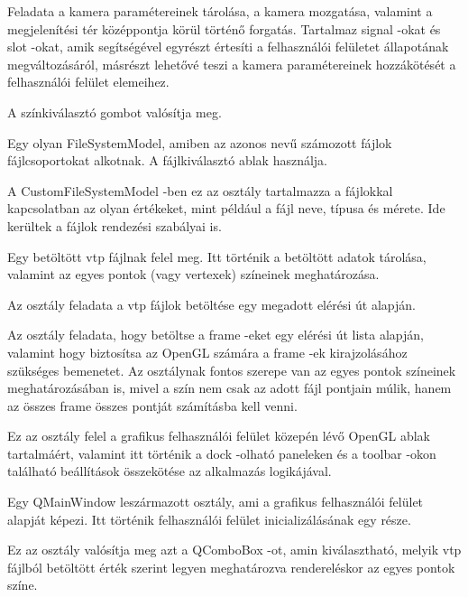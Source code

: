 \begin{description}[font=\normalfont\itshape\space]
\item [Camera:]
Feladata a kamera paramétereinek tárolása, 
a kamera mozgatása, valamint 
a megjelenítési tér középpontja körül történő forgatás. 
Tartalmaz signal -okat és slot -okat, 
amik segítségével egyrészt értesíti 
a felhasználói felületet állapotának megváltozásáról, 
másrészt lehetővé teszi a kamera paramétereinek hozzákötését 
a felhasználói felület elemeihez.
\item [ColorButton:]
A színkiválasztó gombot valósítja meg.
\item [CustomFileSystemModel:]
Egy olyan FileSystemModel, 
amiben az azonos nevű számozott fájlok fájlcsoportokat alkotnak. 
A fájlkiválasztó ablak használja.
\item [FileEntry:]
A {\ttfamily CustomFileSystemModel} -ben ez az osztály tartalmazza 
a fájlokkal kapcsolatban az olyan értékeket, 
mint például a fájl neve, típusa és mérete. 
Ide kerültek a fájlok rendezési szabályai is.
\item [Frame:]
Egy betöltött vtp fájlnak felel meg. 
Itt történik a betöltött adatok tárolása, 
valamint az egyes pontok (vagy vertexek) színeinek meghatározása.
\item [FrameReader:]
Az osztály feladata a vtp fájlok betöltése egy megadott elérési út alapján.
\item [FrameSystem:]
Az osztály feladata, 
hogy betöltse a frame -eket egy elérési út lista alapján, 
valamint hogy biztosítsa az OpenGL számára 
a frame -ek kirajzolásához szükséges bemenetet. 
Az osztálynak fontos szerepe van az egyes pontok színeinek meghatározásában is, 
mivel a szín nem csak az adott fájl pontjain múlik, 
hanem az összes frame összes pontját számításba kell venni.
\item [GLWidget:]
Ez az osztály felel a grafikus felhasználói felület 
közepén lévő OpenGL ablak tartalmáért, 
valamint itt történik 
a dock -olható paneleken és a toolbar -okon található 
beállítások összekötése az alkalmazás logikájával.
\item [MainWindow:]
Egy {\ttfamily QMainWindow} leszármazott osztály, 
ami a grafikus felhasználói felület alapját képezi. 
Itt történik felhasználói felület inicializálásának egy része.
\item [MaterialColoringComboBox:]
Ez az osztály valósítja meg azt a {\ttfamily QComboBox} -ot, 
amin kiválasztható, 
melyik vtp fájlból betöltött érték szerint legyen meghatározva rendereléskor 
az egyes pontok színe.

\end{description}
